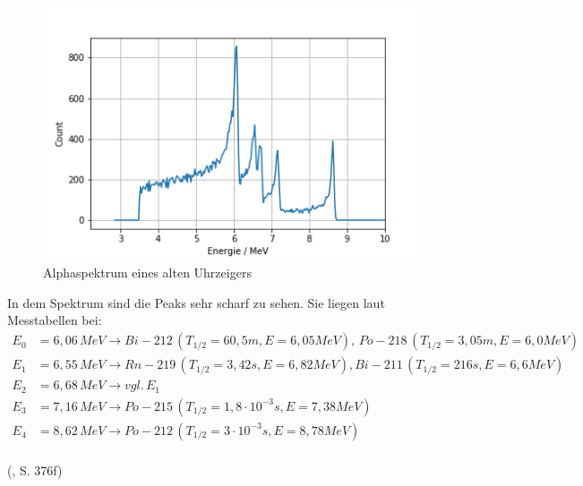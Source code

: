 \begin{figure}[h]
    \centering
    \includegraphics[scale=0.65]{Bilder/uhr.png}
    \caption{Alphaspektrum eines alten Uhrzeigers}
    \label{bild:uhr}
\end{figure}

In dem Spektrum sind die Peaks sehr scharf zu sehen. Sie liegen laut Messtabellen bei: \\

\begin{align*}
    E_0 &= 6,06 \, MeV \to Bi-212 \, (T_{1/2} = 60,5m, E = 6,05 MeV),\, Po-218 \, (T_{1/2} = 3,05m, E = 6,0 MeV) \\
    E_1 &= 6,55 \, MeV \to Rn-219 \, (T_{1/2} = 3,42s, E = 6,82 MeV), Bi-211 \, (T_{1/2} = 216s, E = 6,6 MeV)\\
    E_2 &= 6,68 \, MeV \to vgl. \, E_1 \\
    E_3 &= 7,16 \, MeV \to Po-215 \, (T_{1/2} = 1,8 \cdot 10^{-3}s, E = 7,38 MeV) \\
    E_4 &= 8,62 \, MeV \to Po-212 \, (T_{1/2} = 3 \cdot 10^{-3}s, E = 8,78 MeV) \\
\end{align*}

(\cite{Mende2016}, S. 376f)





